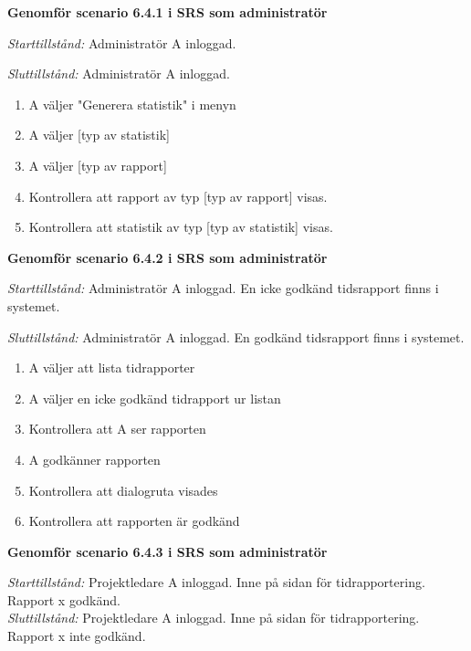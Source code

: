 \documentclass[a4paper]{article}
\begin{document}
\begin{ST}

\item
\textbf{Genomför scenario 6.4.1 i SRS som administratör}

\emph{Starttillstånd:} Administratör A inloggad.

\emph{Sluttillstånd:} Administratör A inloggad.

\begin{enumerate}
\item
A väljer "Generera statistik" i menyn
\item
A väljer [typ av statistik]
\item 
A väljer [typ av rapport]
\item
Kontrollera att rapport av typ [typ av rapport] visas.
\item
Kontrollera att statistik av typ [typ av statistik] visas.
\end{enumerate}

\item
\textbf{Genomför scenario 6.4.2 i SRS som administratör}

\emph{Starttillstånd:} Administratör A inloggad. En icke godkänd tidsrapport finns i systemet.

\emph{Sluttillstånd:} Administratör A inloggad. En godkänd tidsrapport finns i systemet.

\begin{enumerate}

\item
A väljer att lista tidrapporter
\item
A väljer en icke godkänd tidrapport ur listan
\item
Kontrollera att A ser rapporten
\item
A godkänner rapporten
\item
Kontrollera att dialogruta visades
\item
Kontrollera att rapporten är godkänd

\end{enumerate}

\item
\textbf{Genomför scenario 6.4.3 i SRS som administratör}

\emph{Starttillstånd:} Projektledare A inloggad. Inne på sidan för tidrapportering. Rapport x godkänd.\\
\emph{Sluttillstånd:} Projektledare A inloggad. Inne på sidan för tidrapportering. Rapport x inte godkänd.\\



\end{ST}
\end{document}
